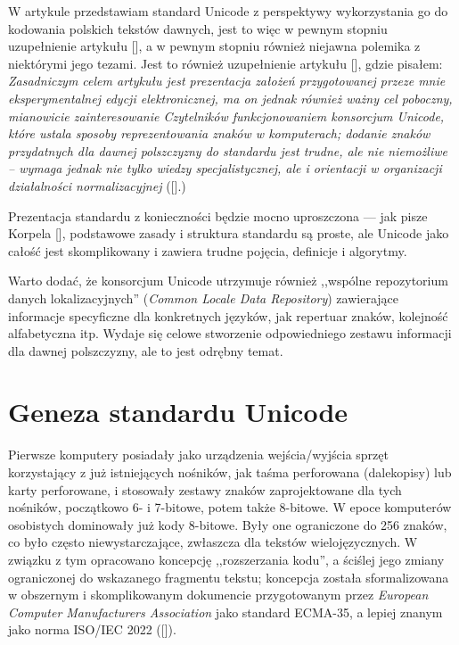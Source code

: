 

W artykule przedstawiam standard Unicode z perspektywy wykorzystania
go do kodowania polskich tekstów dawnych, jest to więc w pewnym
stopniu uzupełnienie artykułu [\cite{Strzelczyk_2013}], a w pewnym
stopniu również niejawna polemika z niektórymi jego tezami. Jest to
również uzupełnienie artykułu [\cite{bien_parkoszPSP}], gdzie pisałem:
\textit{Zasadniczym celem artykułu jest prezentacja założeń
  przygotowanej przeze mnie eksperymentalnej edycji
  elektronicznej, ma on jednak również ważny cel poboczny, mianowicie
  zainteresowanie Czytelników funkcjonowaniem konsorcjum Unicode,
  które ustala sposoby reprezentowania znaków w komputerach; dodanie
  znaków przydatnych dla dawnej polszczyzny do standardu  jest trudne,
  ale nie niemożliwe – wymaga jednak nie tylko wiedzy
  specjalistycznej, ale i orientacji w organizacji działalności
  normalizacyjnej} ([\cite[s. 27]{bien_parkoszPSP}].)

Prezentacja standardu z konieczności będzie mocno uproszczona
--- jak pisze Korpela [\cite*[s. 198 ]{korpela_unicode_2006}], podstawowe
zasady i struktura standardu są proste, ale Unicode jako całość jest
skomplikowany i zawiera trudne pojęcia, definicje i algorytmy.


Warto dodać, że konsorcjum Unicode utrzymuje również ,,wspólne
repozytorium danych lokalizacyjnych'' (\textit{Common Locale Data
  Repository}) zawierające informacje specyficzne dla konkretnych
języków, jak repertuar znaków, kolejność alfabetyczna itp. Wydaje się
celowe stworzenie odpowiedniego zestawu informacji dla dawnej
polszczyzny, ale to jest odrębny temat.

\section{Geneza standardu Unicode}
\label{sec:geneza-stand-unic}

Pierwsze komputery posiadały jako urządzenia wejścia/wyjścia sprzęt
korzystający z już istniejących nośników, jak taśma perforowana
(dalekopisy) lub karty perforowane, i stosowały zestawy znaków
zaprojektowane dla tych nośników, początkowo 6- i 7-bitowe, potem
także 8-bitowe. W epoce komputerów osobistych dominowały już kody
8-bitowe. Były one ograniczone do 256 znaków, co było często
niewystarczające, zwłaszcza dla tekstów wielojęzycznych. W związku z
tym opracowano koncepcję ,,rozszerzania kodu'', a ściślej jego zmiany
ograniczonej do wskazanego fragmentu tekstu; koncepcja została
sformalizowana w obszernym i skomplikowanym dokumencie przygotowanym
przez \textit{European Computer Manufacturers Association} jako
standard ECMA-35, a lepiej znanym jako norma ISO/IEC 2022
([\cite{wiki:ISO2022:2020}]).

